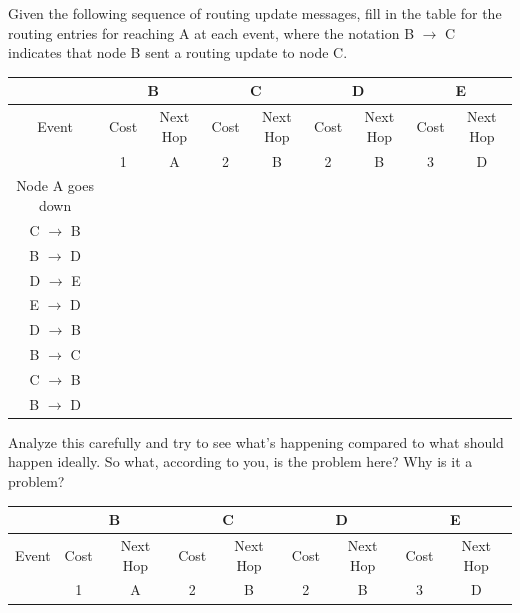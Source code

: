 \documentclass[10pt, a4paper]{article}
\begin{document}
\begin{enumerate}
    Given the following sequence of routing update messages, fill in the table for the routing entries for reaching A at each event, where the notation B $\rightarrow$ C indicates that node B sent a routing update to node C.\\
    \begin{center}
        \begin{tabular}{|c|c|c|c|c|c|c|c|c|}
            \hline
            & \multicolumn{2}{|c|}{B} & \multicolumn{2}{|c|}{C} & \multicolumn{2}{|c|}{D} & \multicolumn{2}{|c|}{E}\\
            \hline
            Event & Cost & Next Hop & Cost & Next Hop & Cost & Next Hop & Cost & Next Hop\\
            \hline
            & 1 & A & 2 & B & 2 & B & 3 & D\\
            \hline
            Node A goes down & & & & & & & & \\
            \hline
            C $\rightarrow$ B & & & & & & & & \\
            \hline
            B $\rightarrow$ D & & & & & & & & \\
            \hline
            D $\rightarrow$ E & & & & & & & & \\
            \hline
            E $\rightarrow$ D & & & & & & & & \\
            \hline
            D $\rightarrow$ B & & & & & & & & \\
            \hline
            B $\rightarrow$ C & & & & & & & & \\
            \hline
            C $\rightarrow$ B & & & & & & & & \\
            \hline
            B $\rightarrow$ D & & & & & & & & \\
            \hline
        \end{tabular}
    \end{center}
    Analyze this carefully and try to see what's happening compared to what should happen ideally. So what, according to you, is the problem here? Why is it a problem?\\
    \color{blue}
    \begin{tabular}{|c|c|c|c|c|c|c|c|c|}
        \hline
        & \multicolumn{2}{|c|}{B} & \multicolumn{2}{|c|}{C} & \multicolumn{2}{|c|}{D} & \multicolumn{2}{|c|}{E}\\
        \hline
        Event & Cost & Next Hop & Cost & Next Hop & Cost & Next Hop & Cost & Next Hop\\
        \hline
        & 1 & A & 2 & B & 2 & B & 3 & D\\

\end{tabular}
\end{enumerate}
\end{document}
